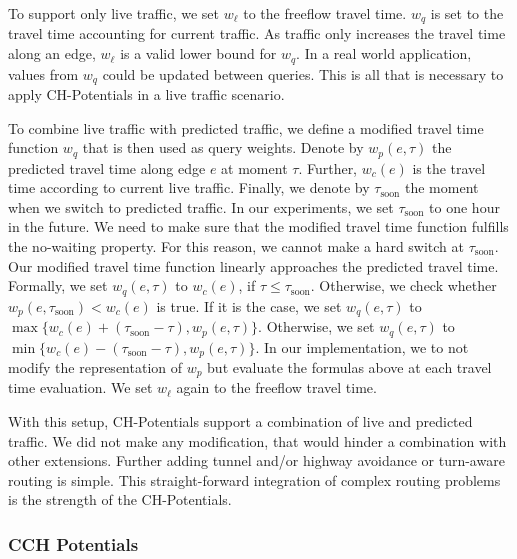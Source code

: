 \documentclass[a4paper,UKenglish,cleveref, autoref, thm-restate]{lipics-v2021}
\begin{document}
To support only live traffic, we set $w_\ell$ to the freeflow travel time.
$w_q$ is set to the travel time accounting for current traffic.
As traffic only increases the travel time along an edge, $w_\ell$ is a valid lower bound for $w_q$.
In a real world application, values from $w_q$ could be updated between queries.
This is all that is necessary to apply CH-Potentials in a live traffic scenario.

To combine live traffic with predicted traffic, we define a modified travel time function $w_q$ that is then used as query weights.
Denote by $w_p(e,\tau)$ the predicted travel time along edge $e$ at moment $\tau$.
Further, $w_c(e)$ is the travel time according to current live traffic.
Finally, we denote by $\tau_{\mathrm{soon}}$ the moment when we switch to predicted traffic.
In our experiments, we set $\tau_{\mathrm{soon}}$ to one hour in the future.
We need to make sure that the modified travel time function fulfills the no-waiting property.
For this reason, we cannot make a hard switch at $\tau_{\mathrm{soon}}$.
Our modified travel time function linearly approaches the predicted travel time. %
%
Formally, we set $w_q(e,\tau)$ to $w_c(e)$, if $\tau \leq \tau_{\mathrm{soon}}$.
Otherwise, we check whether $w_p(e,\tau_{\mathrm{soon}}) < w_c(e)$ is true.
If it is the case, we set $w_q(e,\tau)$ to $\max\{w_c(e)+(\tau_{\mathrm{soon}}-\tau), w_p(e,\tau)\}$.
Otherwise, we set $w_q(e,\tau)$ to $\min\{w_c(e)-(\tau_{\mathrm{soon}}-\tau), w_p(e,\tau)\}$.
In our implementation, we to not modify the representation of $w_p$ but evaluate the formulas above at each travel time evaluation.
We set $w_\ell$ again to the freeflow travel time.

With this setup, CH-Potentials support a combination of live and predicted traffic.
We did not make any modification, that would hinder a combination with other extensions.
Further adding tunnel and/or highway avoidance or turn-aware routing is simple.
This straight-forward integration of complex routing problems is the strength of the CH-Potentials.

\subsubsection{CCH Potentials}
\end{document}
